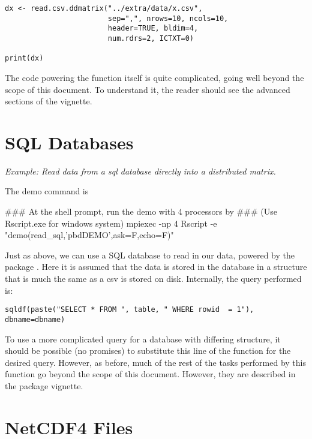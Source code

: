 \begin{lstlisting}[language=rr,title=Reading a CSV with Multiple Readers]
dx <- read.csv.ddmatrix("../extra/data/x.csv", 
                        sep=",", nrows=10, ncols=10, 
                        header=TRUE, bldim=4, 
                        num.rdrs=2, ICTXT=0)

print(dx)
\end{lstlisting}

The code powering the function itself is quite complicated, going well beyond the scope of this document.  To understand it, the reader should see the advanced sections of the  vignette.

\section{SQL Databases}
\label{sec:sql_db}

\emph{Example:  Read data from a sql database directly into a distributed matrix.}

The demo command is
\begin{Command}
### At the shell prompt, run the demo with 4 processors by
### (Use Rscript.exe for windows system)
mpiexec -np 4 Rscript -e "demo(read_sql,'pbdDEMO',ask=F,echo=F)"
\end{Command}

Just as above, we can use a SQL database to read in our data, powered by the  package \citep{sqldf}.  Here it is assumed that the data is stored in the database in a structure that is much the same as a csv is stored on disk.  Internally, the query performed is:

\begin{lstlisting}[language=rr]
sqldf(paste("SELECT * FROM ", table, " WHERE rowid  = 1"), dbname=dbname)
\end{lstlisting}

To use a more complicated query for a database with differing structure, it should be possible (no promises) to substitute this line of the  function for the desired query.  However, as before, much of the rest of the tasks performed by this function go beyond the scope of this document.  However, they are described in the  package vignette.









\section{NetCDF4 Files}

